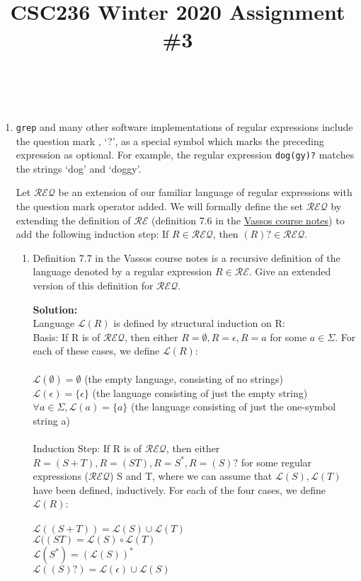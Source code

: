 \documentclass[boldsans]{article}
\title{CSC236 Winter 2020 Assignment \#3}
\author{\name \\ \textit{\utorid}}
\newenvironment{solution}
{\bigskip \noindent \textbf{Solution: \\}}
{}
\newcommand{\RE}{\mathcal{RE}}
\newcommand{\REQ}{\mathcal{REQ}}
\renewcommand{\L}{\mathcal{L}}
\begin{document}
\maketitle

\begin{enumerate}

\item \texttt{grep} and many other software implementations of regular expressions include the question mark , `?', as a special symbol which marks the preceding expression as optional. For example, the regular expression \texttt{dog(gy)?} matches the strings `dog' and `doggy'.

Let $\REQ$ be an extension of our familiar language of regular expressions with the question mark operator added. We will formally define the set $\REQ$ by extending the definition of $\RE$ (definition 7.6 in the \href{http://www.cs.toronto.edu/~vassos/b36-notes/notes.pdf}{Vassos course notes}) to add the following induction step: If $R \in \REQ$, then $(R)? \in \REQ$.

\begin{enumerate}
    \item Definition 7.7 in the Vassos course notes is a recursive definition of the language denoted by a regular expression $R \in \RE$. Give an extended version of this definition for $\REQ$.
    
    \begin{solution}
    Language $\L(R)$ is defined by structural induction on R:\\
    Basis: If R is of $\REQ$, then either $R = \emptyset, R = \epsilon, R = a$ for some $a \in \Sigma$. For each of these cases, we define $\L(R)$:\\
    \\
    $\L(\emptyset) = \emptyset$ (the empty language, consisting of no strings)\\
    $\L(\epsilon) = \{\epsilon\}$ (the language consisting of just the empty string)\\
    $\forall a \in \Sigma, \L(a) = \{a\}$ (the language consisting of just the one-symbol string a)\\
    \\
    Induction Step: If R is of $\REQ$, then either $R=(S+T), R=(ST), R=S^*, R=(S)?$ for some regular expressions ($\REQ$) S and T, where we can assume that $\L(S), \L(T)$ have been defined, inductively. For each of the four cases, we define $\L(R)$:\\
    \\
    $\L((S+T)) = \L(S) \cup \L(T)$\\
    $\L((ST) = \L(S)\circ \L(T)$\\
    $\L(S^*) = (\L(S))^*$\\
    $\L((S)?) = \L(\epsilon) \cup \L(S)$\\
    \\
    \end{solution}
    

\end{enumerate}
\end{enumerate}
\end{document}
